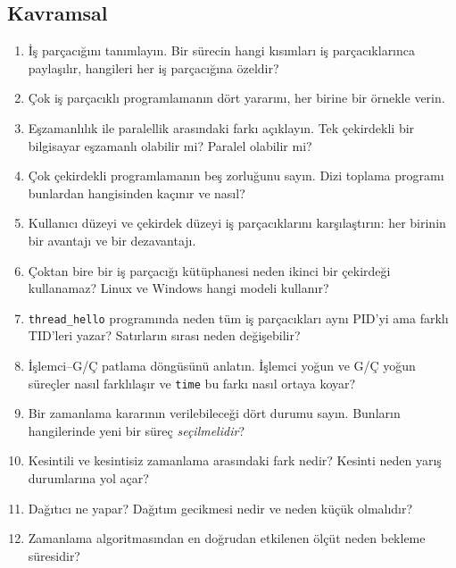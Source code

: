 \documentclass[11pt,a4paper]{article}
\newcommand{\cmd}[1]{\texttt{#1}}
\begin{document}
\subsection*{Kavramsal}
\begin{enumerate}[leftmargin=1.6em]
  \item İş parçacığını tanımlayın. Bir sürecin hangi kısımları iş parçacıklarınca paylaşılır, hangileri her iş parçacığına özeldir?
  \item Çok iş parçacıklı programlamanın dört yararını, her birine bir örnekle verin.
  \item Eşzamanlılık ile paralellik arasındaki farkı açıklayın. Tek çekirdekli bir bilgisayar eşzamanlı olabilir mi? Paralel olabilir mi?
  \item Çok çekirdekli programlamanın beş zorluğunu sayın. Dizi toplama programı bunlardan hangisinden kaçınır ve nasıl?
  \item Kullanıcı düzeyi ve çekirdek düzeyi iş parçacıklarını karşılaştırın: her birinin bir avantajı ve bir dezavantajı.
  \item Çoktan bire bir iş parçacığı kütüphanesi neden ikinci bir çekirdeği kullanamaz? Linux ve Windows hangi modeli kullanır?
  \item \cmd{thread\_hello} programında neden tüm iş parçacıkları aynı PID'yi ama farklı TID'leri yazar? Satırların sırası neden değişebilir?
  \item İşlemci--G/Ç patlama döngüsünü anlatın. İşlemci yoğun ve G/Ç yoğun süreçler nasıl farklılaşır ve \cmd{time} bu farkı nasıl ortaya koyar?
  \item Bir zamanlama kararının verilebileceği dört durumu sayın. Bunların hangilerinde yeni bir süreç \emph{seçilmelidir}?
  \item Kesintili ve kesintisiz zamanlama arasındaki fark nedir? Kesinti neden yarış durumlarına yol açar?
  \item Dağıtıcı ne yapar? Dağıtım gecikmesi nedir ve neden küçük olmalıdır?
  \item Zamanlama algoritmasından en doğrudan etkilenen ölçüt neden bekleme süresidir?
\end{enumerate}
\end{document}
